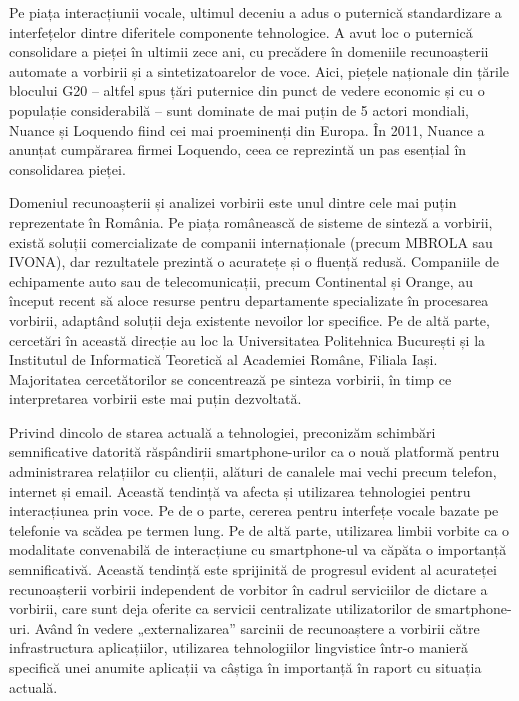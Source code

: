 \begin{multicols}{2}
Pe piața interacțiunii vocale, ultimul deceniu a adus o puternică standardizare a interfețelor dintre diferitele componente tehnologice. A avut loc o puternică consolidare a pieței în ultimii zece ani, cu precădere în domeniile recunoașterii automate a vorbirii și a sintetizatoarelor de voce. Aici, piețele naționale din țările blocului G20 – altfel spus țări puternice din punct de vedere economic și cu o populație considerabilă – sunt dominate de mai puțin de 5 actori mondiali, Nuance și Loquendo fiind cei mai proeminenți din Europa. În 2011, Nuance a anunțat cumpărarea firmei Loquendo, ceea ce reprezintă un pas esențial în consolidarea pieței.

Domeniul recunoașterii și analizei vorbirii este unul dintre cele mai puțin reprezentate în România. Pe piața românească de sisteme de sinteză a vorbirii, există soluții comercializate de companii internaționale (precum MBROLA sau IVONA), dar rezultatele prezintă o acuratețe și o fluență redusă. Companiile de echipamente auto sau de telecomunicații, precum Continental și Orange, au început recent să aloce resurse pentru departamente specializate în procesarea vorbirii, adaptând soluții deja existente nevoilor lor specifice. Pe de altă parte, cercetări în această direcție au loc la Universitatea Politehnica București și la Institutul de Informatică Teoretică al Academiei Române, Filiala Iași. Majoritatea cercetătorilor se concentrează pe sinteza vorbirii, în timp ce interpretarea vorbirii este mai puțin dezvoltată.

Privind dincolo de starea actuală a tehnologiei, preconizăm schimbări semnificative datorită răspândirii smartphone-urilor ca o nouă platformă pentru administrarea relațiilor cu clienții, alături de canalele mai vechi precum telefon, internet și email. Această tendință va afecta și utilizarea tehnologiei pentru interacțiunea prin voce. Pe de o parte, cererea pentru interfețe vocale bazate pe telefonie va scădea pe termen lung. Pe de altă parte, utilizarea limbii vorbite ca o modalitate convenabilă de interacțiune cu smartphone-ul va căpăta o importanță semnificativă. Această tendință este sprijinită de progresul evident al acurateței recunoașterii vorbirii independent de vorbitor în cadrul serviciilor de dictare a vorbirii, care sunt deja oferite ca servicii centralizate utilizatorilor de smartphone-uri. Având în vedere „externalizarea” sarcinii de recunoaștere a vorbirii către infrastructura aplicațiilor, utilizarea tehnologiilor lingvistice într-o manieră specifică unei anumite aplicații va câștiga în importanță în raport cu situația actuală.


\end{multicols}
